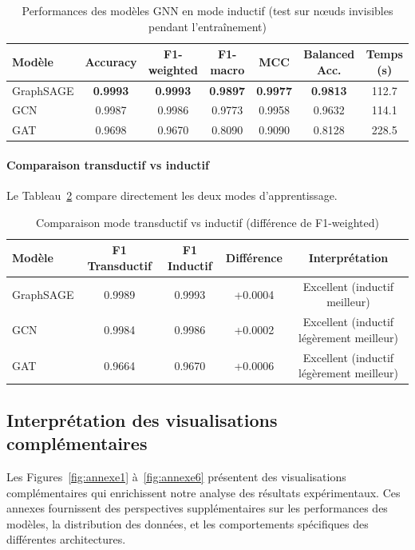 ﻿\documentclass[11pt,a4paper]{article}
\begin{document}
\begin{table}[htbp]
\centering
\caption{Performances des modèles GNN en mode inductif (test sur nœuds invisibles pendant l'entraînement)}
\label{tab:gnn_inductif}
\begin{tabular}{lcccccc}
\toprule
\textbf{Modèle} & \textbf{Accuracy} & \textbf{F1-weighted} & \textbf{F1-macro} & \textbf{MCC} & \textbf{Balanced Acc.} & \textbf{Temps (s)} \\
\midrule
GraphSAGE & \textbf{0.9993} & \textbf{0.9993} & \textbf{0.9897} & \textbf{0.9977} & \textbf{0.9813} & 112.7 \\
GCN       & 0.9987 & 0.9986 & 0.9773 & 0.9958 & 0.9632 & 114.1 \\
GAT       & 0.9698 & 0.9670 & 0.8090 & 0.9090 & 0.8128 & 228.5 \\
\bottomrule
\end{tabular}
\end{table}

\paragraph{Comparaison transductif vs inductif}

Le Tableau~\ref{tab:gnn_comparison} compare directement les deux modes d'apprentissage.

\begin{table}[htbp]
\centering
\caption{Comparaison mode transductif vs inductif (différence de F1-weighted)}
\label{tab:gnn_comparison}
\begin{tabular}{lcccc}
\toprule
\textbf{Modèle} & \textbf{F1 Transductif} & \textbf{F1 Inductif} & \textbf{Différence} & \textbf{Interprétation} \\
\midrule
GraphSAGE & 0.9989 & 0.9993 & +0.0004 & Excellent (inductif meilleur) \\
GCN       & 0.9984 & 0.9986 & +0.0002 & Excellent (inductif légèrement meilleur) \\
GAT       & 0.9664 & 0.9670 & +0.0006 & Excellent (inductif légèrement meilleur) \\
\bottomrule
\end{tabular}
\end{table}

\subsection{Interprétation des visualisations complémentaires}

Les Figures~\ref{fig:annexe1} à~\ref{fig:annexe6} présentent des visualisations complémentaires qui enrichissent notre analyse des résultats expérimentaux. Ces annexes fournissent des perspectives supplémentaires sur les performances des modèles, la distribution des données, et les comportements spécifiques des différentes architectures.
\end{document}
